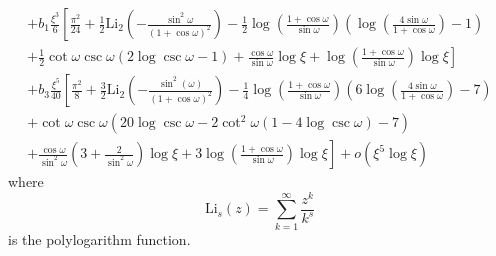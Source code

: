 \documentclass{article}
\begin{document}
\begin{align}
    + b_1\frac{\xi^3}{6}\left[\frac{\pi^2}{24} +  \frac{1}{2}\text{Li}_2\left(-\frac{\sin^2\omega}{(1+\cos\omega)^2}\right) - \frac{1}{2}\log\left(\frac{1+\cos\omega}{\sin\omega}\right)\left(\log\left(\frac{4\sin \omega}{1+\cos \omega}\right)-1\right) \nonumber \right. \\
    \left. + \frac{1}{2}\cot\omega \csc \omega(2\log \csc \omega-1) + \frac{\cos \omega}{\sin \omega}\log \xi + \log\left(\frac{1+\cos\omega}{\sin \omega}\right)\log \xi\right] \nonumber \\
    + b_3 \frac{\xi^5}{40}\left[\frac{\pi^2}{8}+\frac{3}{2}\text{Li}_2\left(-\frac{\sin^2(\omega)}{(1+\cos\omega)^2}\right) - \frac{1}{4}\log\left(\frac{1+\cos \omega}{\sin \omega}\right)\left(6\log\left(\frac{4\sin\omega}{1+\cos\omega}\right) - 7\right) \nonumber \right. \\ \left. + \cot\omega \csc\omega (20\log \csc \omega - 2 \cot^2 \omega (1-4\log \csc \omega)-7) \right. \nonumber \\ \left. + \frac{\cos\omega}{\sin^2\omega}\left(3+\frac{2}{\sin^2\omega}\right)\log \xi + 3\log \left(\frac{1+\cos\omega}{\sin \omega}\right)\log \xi\right] + o(\xi^5\log \xi)
\end{align}
where
\begin{equation}
    \text{Li}_s(z) = \sum_{k=1}^\infty \frac{z^k}{k^s}
\end{equation}
is the polylogarithm function.
\end{document}
